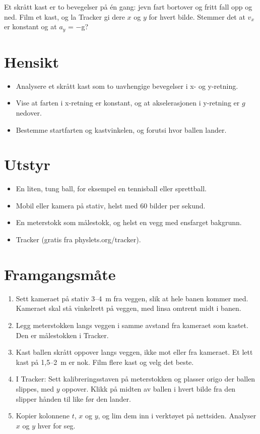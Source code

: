 \documentclass[11pt]{article}
\begin{document}

Et skrått kast er to bevegelser på én gang: jevn fart bortover og fritt fall opp og ned. Film et kast, og la Tracker gi dere $x$ og $y$ for hvert bilde. Stemmer det at $v_{x}$ er konstant og at $a_{y}$ = −g?

\section*{Hensikt}

\begin{itemize}
\item Analysere et skrått kast som to uavhengige bevegelser i x- og y-retning.
\item Vise at farten i x-retning er konstant, og at akselerasjonen i y-retning er $g$ nedover.
\item Bestemme startfarten og kastvinkelen, og forutsi hvor ballen lander.
\end{itemize}

\section*{Utstyr}

\begin{itemize}
\item En liten, tung ball, for eksempel en tennisball eller sprettball.
\item Mobil eller kamera på stativ, helst med 60 bilder per sekund.
\item En meterstokk som målestokk, og helst en vegg med ensfarget bakgrunn.
\item Tracker (gratis fra physlets.org/tracker).
\end{itemize}

\section*{Framgangsmåte}

\begin{enumerate}
\item Sett kameraet på stativ 3–4~m fra veggen, slik at hele banen kommer med. Kameraet skal stå vinkelrett på veggen, med linsa omtrent midt i banen.
\item Legg meterstokken langs veggen i samme avstand fra kameraet som kastet. Den er målestokken i Tracker.
\item Kast ballen skrått oppover langs veggen, ikke mot eller fra kameraet. Et lett kast på 1,5–2~m er nok. Film flere kast og velg det beste.
\item I Tracker: Sett kalibreringsstaven på meterstokken og plasser origo der ballen slippes, med $y$ oppover. Klikk på midten av ballen i hvert bilde fra den slipper hånden til like før den lander.
\item Kopier kolonnene $t$, $x$ og $y$, og lim dem inn i verktøyet på nettsiden. Analyser $x$ og $y$ hver for seg.
\end{enumerate}
\end{document}
